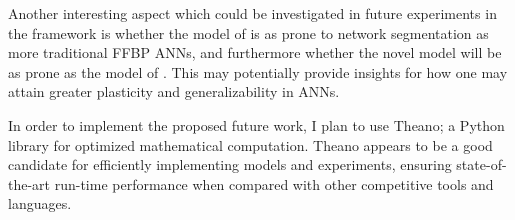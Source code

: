 Another interesting aspect which could be investigated in future experiments in the framework is whether the model of \cite{Hattori2014} is as prone to network segmentation as more traditional FFBP ANNs, and furthermore whether the novel model will be as prone as the model of \cite{Hattori2014}. This may potentially provide insights for how one may attain greater plasticity and generalizability in ANNs.

In order to implement the proposed future work, I plan to use Theano; a Python library for optimized mathematical computation. Theano appears to be a good candidate for efficiently implementing models and experiments, ensuring state-of-the-art run-time performance when compared with other competitive tools and languages.

\cleardoublepage